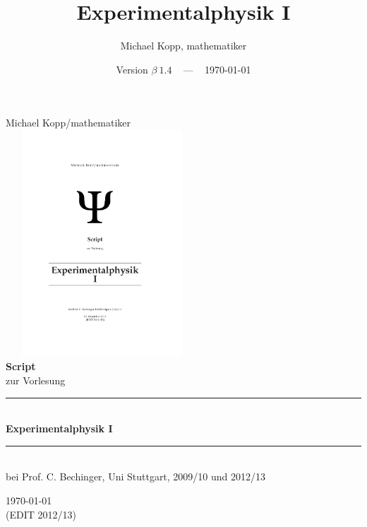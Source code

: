 \documentclass[twoside,a4paper]{book}
\title{Experimentalphysik I}
\author{Michael Kopp, mathematiker}
\date{Version $\beta ~ 1.4$ ~ --- ~ \today}
\begin{document}
\frontmatter


\begin{titlepage}
\begin{center}
\vspace{3em}

{\large \sc  Michael Kopp/mathematiker}\\[8em]
~ ~ \includegraphics[width=0.45\textwidth]{psi}\\[5em]
{\huge \bf Script}\\[0.03\textheight]
{zur Vorlesung}\\[0.08\textheight]
\hrule ~\\[0.4cm]
{\bf \fontsize{35px}{1px} \selectfont Experimentalphysik I}\\[0.4cm]
\hrule ~ \\[8em] %
{bei Prof. C. Bechinger, Uni Stuttgart, 2009/10 und 2012/13}

\vfill

{ \today \\(EDIT 2012/13)}
\end{center}
\end{titlepage}


\tableofcontents


\sloppy		

\end{document}

